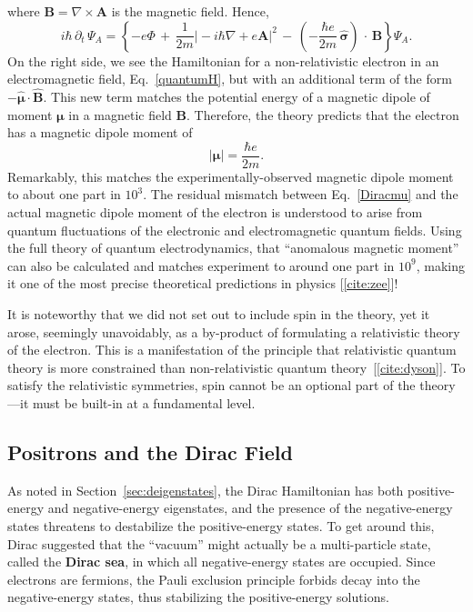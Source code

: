 \documentclass[prx,12pt]{revtex4-2}
\begin{document}
where $\mathbf{B} = \nabla\times\mathbf{A}$ is the magnetic field.
Hence,
\begin{equation}
  i\hbar\, \partial_t \, \Psi_A
  = \left\{-e\Phi
  \,+\, \frac{1}{2m} \big|-i\hbar\nabla +e\mathbf{A} \big|^2
  \,-\, \left(-\frac{\hbar e}{2m}\, \hat{\boldsymbol{\sigma}}\right)
  \,\cdot\, \mathbf{B} \right\} \Psi_A.
\end{equation}
On the right side, we see the Hamiltonian for a non-relativistic
electron in an electromagnetic field, Eq.~\eqref{quantumH}, but with
an additional term of the form $- \hat{\boldsymbol{\mu}} \cdot
\hat{\mathbf{B}}$.  This new term matches the potential energy of a
magnetic dipole of moment $\boldsymbol{\mu}$ in a magnetic field
$\mathbf{B}$.  Therefore, the theory predicts that the electron has a
magnetic dipole moment of
\begin{equation}
  |\boldsymbol{\mu}| = \frac{\hbar e}{2m}.
  \label{Diracmu}
\end{equation}
Remarkably, this matches the experimentally-observed magnetic dipole
moment to about one part in $10^3$.  The residual mismatch between
Eq.~\eqref{Diracmu} and the actual magnetic dipole moment of the
electron is understood to arise from quantum fluctuations of the
electronic and electromagnetic quantum fields.  Using the full theory
of quantum electrodynamics, that ``anomalous magnetic moment'' can
also be calculated and matches experiment to around one part in
$10^9$, making it one of the most precise theoretical predictions in
physics [\ref{cite:zee}]!

It is noteworthy that we did not set out to include spin in the
theory, yet it arose, seemingly unavoidably, as a by-product of
formulating a relativistic theory of the electron.  This is a
manifestation of the principle that relativistic quantum theory is
more constrained than non-relativistic quantum
theory~[\ref{cite:dyson}].  To satisfy the relativistic symmetries,
spin cannot be an optional part of the theory---it must be built-in at
a fundamental level.

\subsection{Positrons and the Dirac Field}
\label{sec:positrons}

As noted in Section~\ref{sec:deigenstates}, the Dirac Hamiltonian has
both positive-energy and negative-energy eigenstates, and the presence
of the negative-energy states threatens to destabilize the
positive-energy states.  To get around this, Dirac suggested that the
``vacuum'' might actually be a multi-particle state, called the
\textbf{Dirac sea}, in which all negative-energy states are occupied.
Since electrons are fermions, the Pauli exclusion principle forbids
decay into the negative-energy states, thus stabilizing the
positive-energy solutions.
\end{document}
